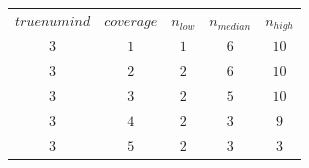 \begin{table}[H]
\begin{tabular}{ccccc}
$truenumind$ & $coverage$ & $n_{low}$ & $n_{median}$ & $n_{high}$\\
$3$ & $1$ & $1$ & $6$ & $10$\\
$3$ & $2$ & $2$ & $6$ & $10$\\
$3$ & $3$ & $2$ & $5$ & $10$\\
$3$ & $4$ & $2$ & $3$ & $9$\\
$3$ & $5$ & $2$ & $3$ & $3$\\
\end{tabular}
\end{table}
 